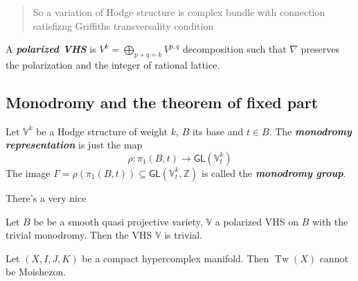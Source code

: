 {\color{4}\begin{quotation}
	So a variation of Hodge structure is complex bundle with connection satisfizng Griffiths transversality condition
\end{quotation}}

\begin{defn}\leavevmode
	A \textit{\textbf{polarized VHS}} is  $V^k=\bigoplus_{p+q=k}V^{p,q}  $ decomposition such that $\nabla$ preserves the polarization and the integer of rational lattice.
\end{defn}

\subsection{Monodromy and the theorem of fixed part}

\begin{defn}\leavevmode
	Let $\mathbb{V}^k$ be a Hodge structure of weight $k$, $B$ its base and $t\in B$. The \textit{\textbf{monodromy representation}} is just the map
	\[\rho:\pi_{1}(B,t) \to \mathsf{GL}(\mathbb{V}^k_t)\]
	The image $\Gamma=\rho(\pi_{1}(B,t) )\subseteq \mathsf{GL}(\mathbb{V}^k_t,\mathbb{Z})$ is called the \textit{\textbf{monodromy group}}.
\end{defn}

There's a very nice
\begin{thm}[Deligne]\leavevmode
	Let $B$ be be a smooth quasi projective variety, $\mathbb{V}$ a polarized VHS on $B$ with the trivial monodromy. Then the VHS $\mathbb{V}$ is trivial.
\end{thm}

\begin{thm}\leavevmode
	Let $(X,I,J,K)$ be a compact hypercomplex manifold. Then  $\operatorname{Tw}(X)$ cannot be Moishezon.
\end{thm}

